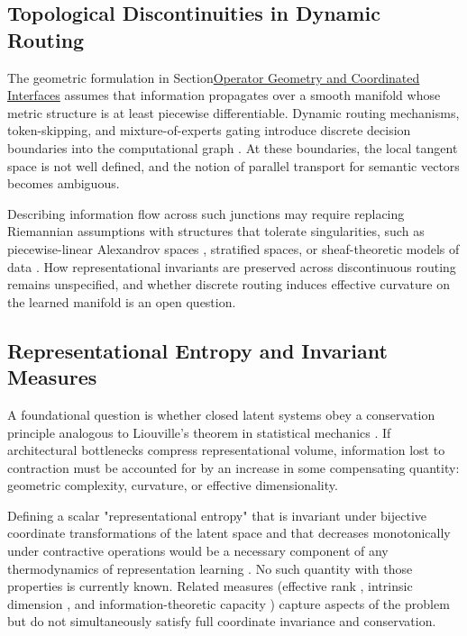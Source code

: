 \subsection{Topological Discontinuities in Dynamic Routing}
The geometric formulation in Section\hyperlink{sec:operator_geometry}{Operator Geometry and Coordinated Interfaces} assumes that information propagates over a smooth manifold whose metric structure is at least piecewise differentiable. Dynamic routing mechanisms, token-skipping, and mixture-of-experts gating introduce discrete decision boundaries into the computational graph \cite{shazeer2017outrageously, fedus2022switch}. At these boundaries, the local tangent space is not well defined, and the notion of parallel transport for semantic vectors becomes ambiguous.

Describing information flow across such junctions may require replacing Riemannian assumptions with structures that tolerate singularities, such as piecewise-linear Alexandrov spaces \cite{burago2001course}, stratified spaces, or sheaf-theoretic models of data \cite{curry2014sheaves}. How representational invariants are preserved across discontinuous routing remains unspecified, and whether discrete routing induces effective curvature on the learned manifold is an open question.

\subsection{Representational Entropy and Invariant Measures}
A foundational question is whether closed latent systems obey a conservation principle analogous to Liouville's theorem in statistical mechanics \cite{arnold1989mathematical}. If architectural bottlenecks compress representational volume, information lost to contraction must be accounted for by an increase in some compensating quantity: geometric complexity, curvature, or effective dimensionality.

Defining a scalar "representational entropy" that is invariant under bijective coordinate transformations of the latent space and that decreases monotonically under contractive operations would be a necessary component of any thermodynamics of representation learning \cite{baez2011category}. No such quantity with those properties is currently known. Related measures (effective rank \cite{roy2019effectiveness}, intrinsic dimension \cite{anselmi2019intrinsic}, and information-theoretic capacity \cite{tishby2015deep}) capture aspects of the problem but do not simultaneously satisfy full coordinate invariance and conservation.

